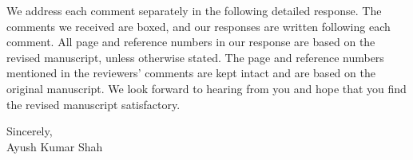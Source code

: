 \noindent We address each comment separately in the following detailed response. 
The comments we received are boxed, and our responses are written following each 
comment. All page and reference numbers in our response are based on the revised 
manuscript, unless otherwise stated. The page and reference numbers mentioned in 
the reviewers' comments are kept intact and are based on the original manuscript. 
We look forward to 
hearing from you and hope that you find the revised manuscript satisfactory.
\vskip 0.2in

\noindent Sincerely, \\
\noindent Ayush Kumar Shah

